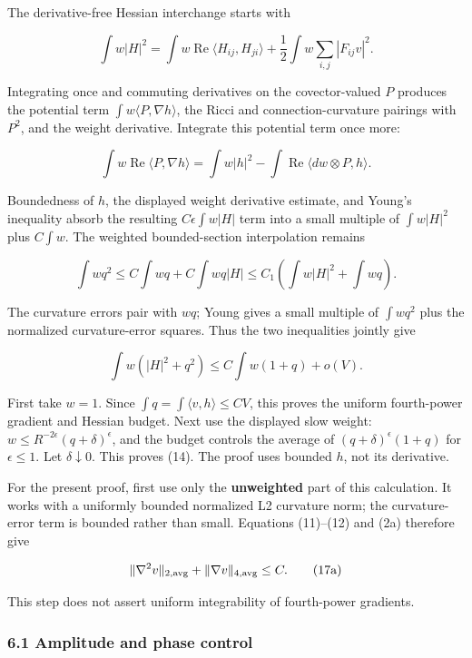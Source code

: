 \documentclass[11pt]{article}
\begin{document}
The derivative-free Hessian interchange starts with

\[
 \int w|H|^2
 =\int w\operatorname{Re}\langle H_{ij},H_{ji}\rangle
      +\frac12\int w\sum_{i,j}|F_{ij}v|^2.
\]

Integrating once and commuting derivatives on the covector-valued \(P\)
produces the potential term \(\int w\langle P,\nabla h\rangle\), the
Ricci and connection-curvature pairings with \(P^2\), and the weight
derivative. Integrate this potential term once more:

\[
 \int w\operatorname{Re}\langle P,\nabla h\rangle
 =\int w|h|^2-\int\operatorname{Re}\langle dw\otimes P,h\rangle.
\tag{15}
\]

Boundedness of \(h\), the displayed weight derivative estimate, and
Young's inequality absorb the resulting \(C\epsilon\int w|H|\) term into
a small multiple of \(\int w|H|^2\) plus \(C\int w\). The weighted
bounded-section interpolation remains

\[
 \int wq^2\le C\int wq+C\int wq|H|
 \le C_1\left(\int w|H|^2+\int wq\right).
\tag{16}
\]

The curvature errors pair with \(wq\); Young gives a small multiple of
\(\int wq^2\) plus the normalized curvature-error squares. Thus the two
inequalities jointly give

\[
 \int w(|H|^2+q^2)\le C\int w(1+q)+o(V).
\tag{17}
\]

First take \(w=1\). Since \(\int q=\int\langle v,h\rangle\le CV\), this
proves the uniform fourth-power gradient and Hessian budget. Next use
the displayed slow weight: \(w\le R^{-2\epsilon}(q+\delta)^\epsilon\),
and the budget controls the average of \((q+\delta)^\epsilon(1+q)\) for
\(\epsilon\le1\). Let \(\delta\downarrow0\). This proves (14). The proof
uses bounded \(h\), not its derivative.

For the present proof, first use only the \textbf{unweighted} part of
this calculation. It works with a uniformly bounded normalized L2
curvature norm; the curvature-error term is bounded rather than small.
Equations (11)--(12) and (2a) therefore give

\[
 \|\nabla^2v\|_{2,\rm avg}+\|\nabla v\|_{4,\rm avg}\le C.
\tag{17a}
\]

This step does not assert uniform integrability of fourth-power
gradients.

\hypertarget{o10strength:amplitude-and-phase-control}{%
\subsubsection{6.1 Amplitude and phase
control}\label{o10strength:amplitude-and-phase-control}}
\end{document}

